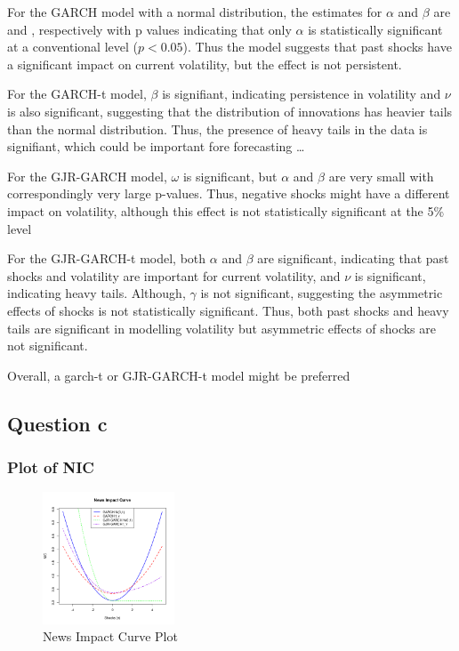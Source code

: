\documentclass{article}
\begin{document}
For the GARCH model with a normal distribution, the estimates for $\alpha$ and $\beta$ are \bw and \bb, respectively with p values indicating that only $\alpha$ is statistically significant at a conventional level ($p < 0.05$). Thus the model suggests that past shocks have a significant impact on current volatility, but the effect is not persistent. 

For the GARCH-t model, $\beta$ is signifiant, indicating persistence in volatility and $\nu$ is also significant, suggesting that the distribution of innovations has heavier tails than the normal distribution. 
Thus, the presence of heavy tails in the data is signifiant, which could be important fore forecasting \ldots

For the GJR-GARCH model, $\omega$ is significant, but $\alpha$ and $\beta$ are very small with correspondingly very large p-values. 
Thus, negative shocks might have a different impact on volatility, although this effect is not statistically significant at the 5\% level

For the GJR-GARCH-t model, both $\alpha$ and $\beta$ are significant, indicating that past shocks and volatility are important for current volatility, and $\nu$ is significant, indicating heavy tails. 
Although, $\gamma$ is not significant, suggesting the asymmetric effects of shocks is not statistically significant. 
Thus, both past shocks and heavy tails are significant in modelling volatility but asymmetric effects of shocks are not significant. 

Overall, a garch-t or GJR-GARCH-t model might be preferred


\subsection*{Question c}
\subsubsection*{Plot of NIC}
 
\begin{figure}[H]
    \centering
    \includegraphics[width=0.35\textwidth]{../../docs/figures/NIC.png}
    \caption{News Impact Curve Plot}
    \label{fig:logreturn}
\end{figure}
\end{document}
